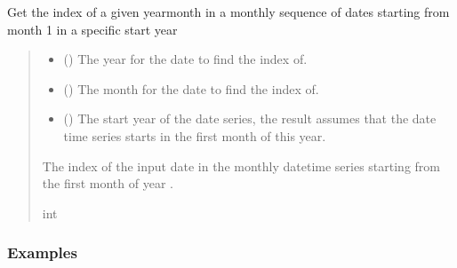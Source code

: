 \documentclass[letterpaper,10pt,english]{sphinxmanual}
\begin{document}
\begin{fulllineitems}
\label{\detokenize{misc:glomar_gridding.utils.get_date_index}}
\pysigstartsignatures
\pysiglinewithargsret
{}
{\sphinxparamcomma {}\sphinxparamcomma {}}
{}
\pysigstopsignatures
\sphinxAtStartPar
Get the index of a given year\sphinxhyphen{}month in a monthly sequence of dates
starting from month 1 in a specific start year
\begin{quote}\begin{description}
\begin{itemize}
\item {}
\sphinxAtStartPar
{} () \textendash{} The year for the date to find the index of.

\item {}
\sphinxAtStartPar
{} () \textendash{} The month for the date to find the index of.

\item {}
\sphinxAtStartPar
{} () \textendash{} The start year of the date series, the result assumes that the date
time series starts in the first month of this year.

\end{itemize}

\sphinxAtStartPar
{} \textendash{} The index of the input date in the monthly datetime series starting from
the first month of year .

\sphinxAtStartPar
int

\end{description}\end{quote}
\subsubsection*{Examples}

\begin{sphinxVerbatim}[commandchars=\\\{\}]
  
\end{sphinxVerbatim}

\end{fulllineitems}
\end{document}

